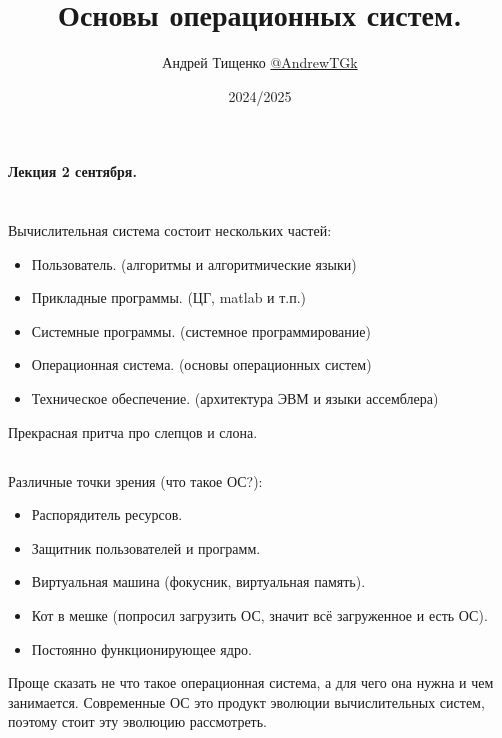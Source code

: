 \documentclass[12pt, a4paper]{article}
\title{Основы операционных систем.}
\author{Андрей Тищенко \href{https://t.me/AndrewTGk}{@AndrewTGk}}
\date{2024/2025}
\begin{document}
    \maketitle
    \begin{center}
        \textbf{Лекция 2 сентября.}
    \end{center}
    \section{}
    Вычислительная система состоит нескольких частей:
    \begin{itemize}
        \item Пользователь. (алгоритмы и алгоритмические языки)
        \item Прикладные программы. (ЦГ, matlab и т.п.)
        \item Системные программы. (системное программирование)
        \item Операционная система. (основы операционных систем)
        \item Техническое обеспечение. (архитектура ЭВМ и языки ассемблера)
    \end{itemize}
    Прекрасная притча про слепцов и слона.
    \subsection{}
    Различные точки зрения (что такое ОС?):
    \begin{itemize}
        \item Распорядитель ресурсов.
        \item Защитник пользователей и программ.
        \item Виртуальная машина (фокусник, виртуальная память).
        \item Кот в мешке (попросил загрузить ОС, значит всё загруженное и есть ОС).
        \item Постоянно функционирующее ядро.
    \end{itemize}
    Проще сказать не что такое операционная система, а для чего она нужна и чем 
    занимается. Современные ОС это продукт эволюции вычислительных систем, поэтому 
    стоит эту эволюцию рассмотреть.
\end{document}
